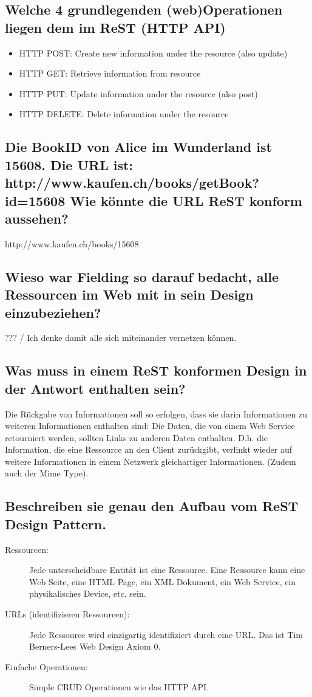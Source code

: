 \subsection{Welche 4 grundlegenden (web)Operationen liegen dem im ReST (HTTP API)}
\begin{itemize}
	\item HTTP POST: Create new information under the resource (also update)
	\item HTTP GET: Retrieve information from resource
	\item HTTP PUT: Update information under the resource (also post)
	\item HTTP DELETE: Delete information under the resource
\end{itemize}

\subsection{Die BookID von Alice im Wunderland ist 15608. Die URL ist: http://www.kaufen.ch/books/getBook?id=15608 Wie könnte die URL ReST konform aussehen?}
http://www.kaufen.ch/books/15608

\subsection{Wieso war Fielding so darauf bedacht, alle Ressourcen im Web mit in sein Design einzubeziehen?}
??? / Ich denke damit alle sich miteinander vernetzen können.

\subsection{Was muss in einem ReST konformen Design in der Antwort enthalten sein?}
Die Rückgabe von Informationen soll so erfolgen, dass sie darin Informationen zu weiteren Informationen enthalten sind: Die Daten, die von einem Web Service retourniert werden, sollten Links zu anderen Daten enthalten. D.h. die Information, die eine Ressource an den Client zurückgibt, verlinkt wieder auf weitere Informationen in einem Netzwerk gleichartiger Informationen. (Zudem auch der Mime Type).

\subsection{Beschreiben sie genau den Aufbau vom ReST Design Pattern.}
\begin{description}
	\item[Ressourcen:] Jede unterscheidbare Entität ist eine Ressource. Eine Ressource kann eine Web Seite, eine HTML Page, ein XML Dokument, ein Web Service, ein physikalisches Device, etc. sein.
	\item[URLs (identifizieren Ressourcen):] Jede Ressource wird einzigartig identifiziert durch eine URL. Das ist Tim Berners-Lees Web Design Axiom 0.
	\item[Einfache Operationen:] Simple CRUD Operationen wie das HTTP API.
\end{description}

